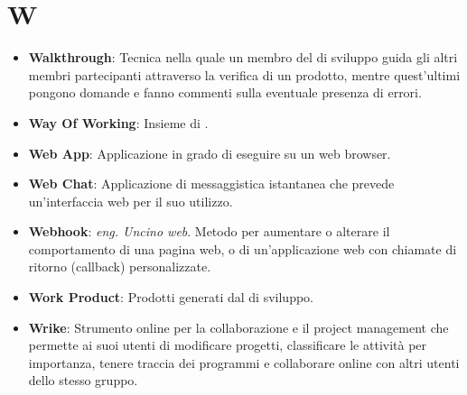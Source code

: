 \section{W}
\begin{itemize}
	\item
	\textbf{Walkthrough}: Tecnica nella quale un membro del  di sviluppo guida gli altri membri partecipanti attraverso la verifica di un prodotto, mentre quest'ultimi pongono domande e fanno commenti sulla eventuale presenza di errori.
	\item
	\textbf{Way Of Working}: Insieme di .
	\item
	\textbf{Web App}: Applicazione in grado di eseguire su un web browser.
	\item
	\textbf{Web Chat}: Applicazione di messaggistica istantanea che prevede un'interfaccia web per il suo utilizzo.
	\item
	\textbf{Webhook}: \textit{eng. Uncino web}. Metodo per aumentare o alterare il comportamento di una pagina web, o di un'applicazione web con chiamate di ritorno (callback) personalizzate.
	\item
	\textbf{Work Product}: Prodotti generati dal  di sviluppo.
	\item
	\textbf{Wrike}: Strumento online per la collaborazione e il project management che permette ai suoi utenti di modificare progetti, classificare le attività per importanza, tenere traccia dei programmi e collaborare online con altri utenti dello stesso gruppo.
\end{itemize}
\newpage